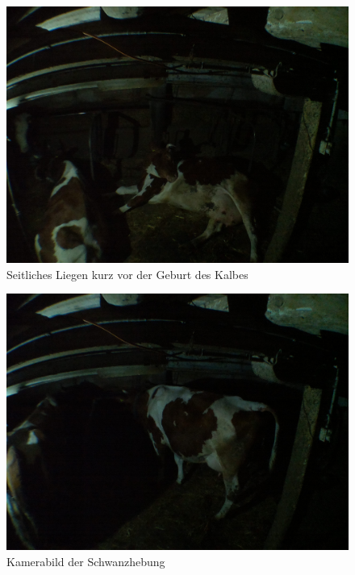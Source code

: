 \begin{figure}[h]
	\center
	\includegraphics[scale=0.075]{Grafiken/seitlichesligen.jpg}
	\caption{Seitliches Liegen kurz vor der Geburt des Kalbes} 
	\label{fig: Seitliches Liegen kurz vor der Geburt des Kalbes}
\end{figure}


\begin{figure}[h]
	\center
	\includegraphics[scale=0.075]{Grafiken/schwanhebungkamerabild.jpg}
	\caption{Kamerabild der Schwanzhebung} 
	\label{fig: Kamerabild der Schwanzhebung}
\end{figure}

